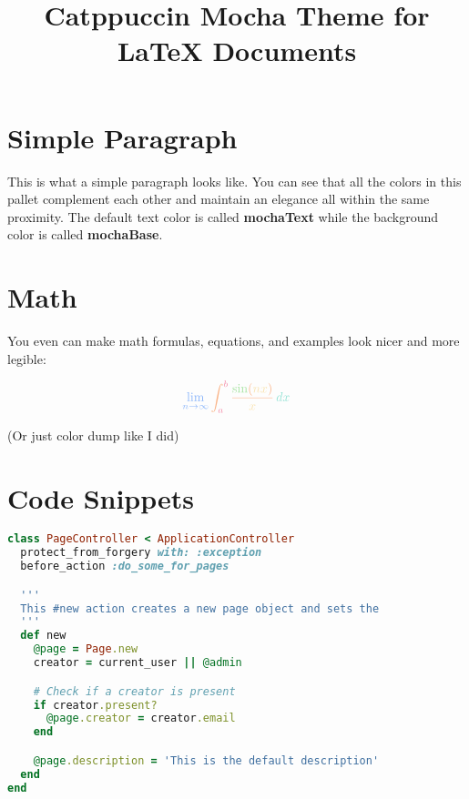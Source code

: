\documentclass[12pt]{article}
\title{ \Huge \textbf{\textcolor{mochaPink}{Catppuccin Mocha Theme for} \textcolor{mochaLavender}{\LaTeX{} Documents}} \vspace{-3em}}
\date{}
\begin{document}
\maketitle

\section{\textcolor{mochaSky}{Simple Paragraph}}
\textcolor{mochaYellow}{This is what a simple paragraph looks like.} You can see that all the colors in this pallet complement each other and maintain an elegance all within the same proximity. The default text color is called \textbf{\textcolor{mochaGreen}{mochaText}} while the background color is called \textbf{\textcolor{mochaGreen}{mochaBase}}.

\section{\textcolor{mochaSky}{Math}}

You even can make math formulas, equations, and examples look nicer and more legible:


\[\large{
    \textcolor{mochaBlue}{\lim_{{n \to \infty}} \textcolor{mochaPeach}{\int_{\textcolor{mochaRed}{a}}^{\textcolor{mochaRed}{b}} \frac{\textcolor{mochaGreen}{\sin}(\textcolor{mochaYellow}{nx})}{\textcolor{mochaYellow}{x}} \, \textcolor{mochaTeal}{dx}}}
}\]

\tiny{(Or just color dump like I did)}

\section{\textcolor{mochaSky}{Code Snippets}}

\begin{lstlisting}[language=Ruby,style=mystyle, caption={A ruby on rails code sample}]
class PageController < ApplicationController
  protect_from_forgery with: :exception
  before_action :do_some_for_pages

  '''
  This #new action creates a new page object and sets the
  '''
  def new
    @page = Page.new
    creator = current_user || @admin

    # Check if a creator is present
    if creator.present?
      @page.creator = creator.email
    end

    @page.description = 'This is the default description'
  end
end
\end{lstlisting}
\end{document}
